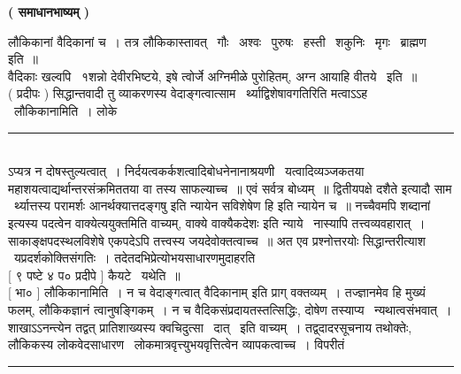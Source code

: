 \documentclass[11pt, openany]{book}
\begin{document}

\begin{multicols}{2}
\begin{center}
\textbf{ ( समाधानभाष्यम् ) }
\end{center}

लौकिकानां वैदिकानां च~। तत्र लौकिकास्तावत् \textendash\ गौः \textendash\ अश्वः \textendash\ पुरुषः \textendash\ हस्ती \textendash\ शकुनिः \textendash\ मृगः \textendash\ ब्राह्मण इति~॥\\

वैदिकाः खल्वपि \textendash\ १शन्नो देवीरभिष्टये, इषे त्वोर्जे अग्निमीळे पुरोहितम्, अग्न आयाहि वीतये \textendash\ इति~॥\\

 ( प्रदीपः ) सिद्धान्तवादी तु व्याकरणस्य वेदाङ्गत्वात्साम \textendash\ र्थ्याद्विशेषावगतिरिति मत्वाऽऽह \textendash\ लौकिकानामिति~। लोके

\noindent
\rule{1\linewidth}{0.5pt}\\

\noindent
ऽप्यत्र न दोषस्तुल्यत्वात्~। निर्दयत्वकर्कशत्वादिबोधनेनानाश्रयणी \textendash\ यत्वादिव्यञ्जकतया महाशयत्वाद्यर्थान्तरसंक्रमिततया वा तस्य साफल्याच्च~॥ एवं सर्वत्र बोध्यम्~॥ द्वितीयपक्षे {\qt दशैते इत्यादौ साम \textendash\ र्थ्यात्तस्य परामर्शः आनर्थक्यात्तदङ्गषु} इति न्यायेन {\qt सविशेषेण हि इति न्यायेन च~॥} नच्चैवमपि {\qt शब्दानां} इत्यस्य पदत्वेन वाक्येत्ययुक्तमिति वाच्यम्, {\qt वाक्ये वाक्यैकदेशः} इति न्याये \textendash\ नास्यापि तत्त्वव्यवहारात्~। साकाङ्क्षपदस्थलविशेषे एकपदेऽपि तत्त्वस्य जयदेवोक्तत्वाच्च~॥ अत एव प्रश्नोत्तरयोः सिद्धान्तरीत्याश \textendash\ यप्रदर्शकोक्तिसंगतिः~। तदेतदभिप्रेत्योभयसाधारणमुदाहरति \textendash\ \\

 [ ९ पष्टे ४ प० प्रदीपे ] कैयटे \textendash\ यथेति~॥\\

 [ भा० ] लौकिकानामिति~। न च वेदाङ्गत्वात् {\qt वैदिकानाम्} इति प्राग् वक्तव्यम्~। तज्ज्ञानमेव हि मुख्यं फलम्, लौकिकज्ञानं त्वानुषङ्गिकम्~। न च वैदिकसंप्रदायतस्तत्सिद्धिः, दोषेण तस्याप्य \textendash\ न्यथात्वसंभवात्~। शाखाऽऽनन्त्येन तद्वत् प्रातिशाख्यस्य क्वचिदुत्सा \textendash\ दात् \textendash\ इति वाच्यम्~। तद्व्दादरसूचनाय तथोक्तेः, लौकिकस्य लोकवेदसाधारण \textendash\ लोकमात्रवृत्त्युभयवृत्तित्वेन व्यापकत्वाच्च~। विपरीतं

\noindent
\rule{1\linewidth}{0.5pt}\\


\end{multicols}
\end{document}
